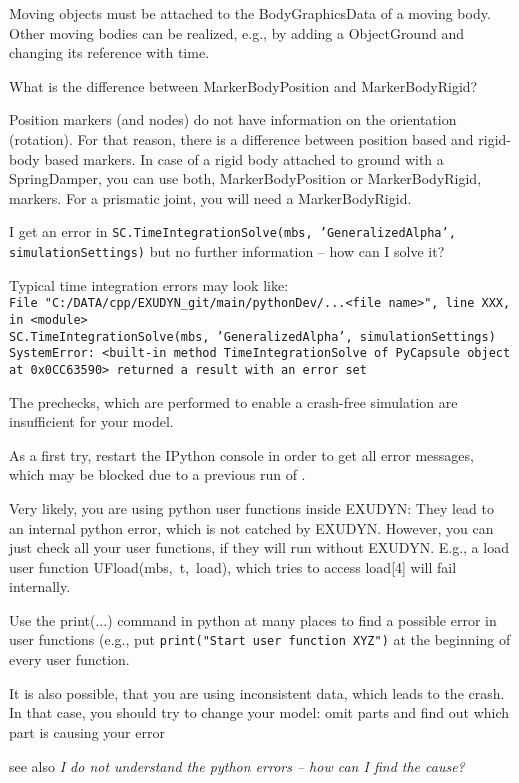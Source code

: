 	Moving objects must be attached to the BodyGraphicsData of a moving body. Other moving bodies can be realized, e.g., by adding a ObjectGround and changing its reference with time.
	\ei
  \item What is the difference between MarkerBodyPosition and MarkerBodyRigid?
	\bi
	\item[$\ra$] Position markers (and nodes) do not have information on the orientation (rotation). For that reason, there is a difference between position based and rigid-body based markers. In case of a rigid body attached to ground with a SpringDamper, you can use both, MarkerBodyPosition or MarkerBodyRigid, markers. For a prismatic joint, you will need a MarkerBodyRigid.
	\ei
  \item I get an error in \texttt{SC.TimeIntegrationSolve(mbs, 'GeneralizedAlpha', simulationSettings)} but no further information -- how can I solve it?
	\bi
	\item[$\ra$] Typical time integration errors may look like:\\
	{\footnotesize
  \texttt{File "C:/DATA/cpp/EXUDYN\_git/main/pythonDev/...<file name>", line XXX, in <module>}\\  
	\texttt{SC.TimeIntegrationSolve(mbs, 'GeneralizedAlpha', simulationSettings)}\\
  \texttt{SystemError: <built-in method TimeIntegrationSolve of PyCapsule object at 0x0CC63590> returned a result with an error set}}
	\item[$\ra$] The prechecks, which are performed to enable a crash-free simulation are insufficient for your model.
	\item[$\ra$] As a first try, restart the IPython console in order to get all error messages, which may be blocked due to a previous run of \codeName.
	\item[$\ra$] Very likely, you are using python user functions inside EXUDYN: They lead to an internal python error, which is not catched by EXUDYN. However, you can just check all your user functions, if they will run without EXUDYN. E.g., a load user function UFload(mbs,~t,~load), which tries to access load[4] will fail internally.
	\item[$\ra$] Use the print(...) command in python at many places to find a possible error in user functions (e.g., put \texttt{print("Start user function XYZ")} at the beginning of every user function.
	\item[$\ra$] It is also possible, that you are using inconsistent data, which leads to the crash. In that case, you should try to change your model: omit parts and find out which part is causing your error
	\item[$\ra$] see also {\it I do not understand the python errors -- how can I find the cause?}
 	\ei


